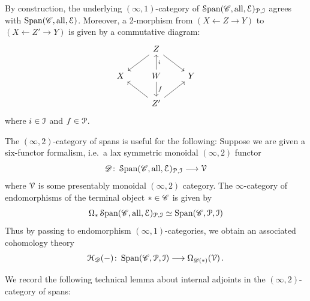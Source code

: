 \begin{rmk}
By construction, the  underlying $(\infty,1)$-category of $\operatorname{\mathcal S\mathrm{pan}}({\mathscr{C}, \mathrm{all}, \mathcal{E}})_{\mathcal{P},\mathcal{I}}$
agrees with $\operatorname{\mathrm{Span}}({\mathscr{C}, \mathrm{all}, \mathcal{E}})$. Moreover, a 2-morphism from 
$\left(X\leftarrow Z\to Y\right)$ to $\left(X\leftarrow Z'\to Y\right)$ is given 
by a commutative diagram:
\[\begin{tikzcd}
	& Z & \\
	X & W & Y \\
	& Z^{\prime}
	\arrow[from=1-2, to=2-1]
	\arrow[from=1-2, to=2-3]
	\arrow["i"', from=2-2, to=1-2]
	\arrow["f", from=2-2, to=3-2]
	\arrow[from=3-2, to=2-1]
	\arrow[from=3-2, to=2-3]
\end{tikzcd}\]
where $i\in\mathcal{I}$ and $f\in\mathcal{P}$.
\end{rmk}

\begin{rmk}\label{rmk: 2span and cohomology}
 The $(\infty,2)$-category of spans is useful for the following: Suppose we are
 given a six-functor formalism, i.e.~a lax symmetric monoidal $(\infty,2)$ functor
 \[ \mathscr{D}\colon \operatorname{\mathcal S\mathrm{pan}}({\mathscr{C}, \mathrm{all}, \mathcal{E}})_{\mathcal{P},\mathcal{I}}\longrightarrow \mathcal{V}\]
 where $\mathcal{V}$ is some presentably monoidal $(\infty,2)$ category. The $\infty$-category
 of endomorphisms of the terminal object $\ast \in \mathscr{C}$ is given by 
 \[ \Omega_{\ast} \operatorname{\mathcal S\mathrm{pan}}({\mathscr{C}, \mathrm{all}, \mathcal{E}})_{\mathcal{P},\mathcal{I}} \simeq \operatorname{\mathrm{Span}}({\mathscr{C}, \mathcal{P}, \mathcal{I}})\]
Thus by passing to endomorphism $(\infty,1)$-categories, we obtain an associated cohomology
 theory 
 \[ \mathcal{H}_{\mathscr{D}}(-)\colon \operatorname{\mathrm{Span}}({\mathscr{C},\mathcal{P},\mathcal{I}}) \longrightarrow \Omega_{\mathscr{D}(\ast)}(\mathcal{V})\,.\]
\end{rmk}

We record the following technical lemma about internal adjoints in the
$(\infty,2)$-category of spans:

